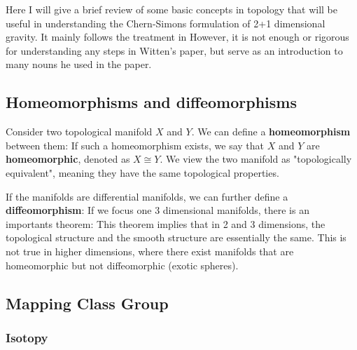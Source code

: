 Here I will give a brief review of some basic concepts in topology
that will be useful in understanding the Chern-Simons formulation of
2+1 dimensional gravity. It mainly follows the treatment in
\cite{Carlip:1998qg} However, it is not enough or rigorous for
understanding any steps in Witten's paper, but serve as an
introduction to many nouns he used in the paper.

\subsection{Homeomorphisms and diffeomorphisms}

Consider two topological manifold \(X\) and \(Y\). We can define a
\textbf{homeomorphism} between them:
If such a homeomorphism exists, we say that \(X\) and \(Y\) are
\textbf{homeomorphic}, denoted as \(X \cong Y\). We view the two
manifold as "topologically equivalent", meaning they have the same
topological properties.

If the manifolds are differential manifolds, we can further define a
\textbf{diffeomorphism}:
If we focus one 3 dimensional manifolds, there is an importants theorem:
This theorem implies that in 2 and 3 dimensions, the topological
structure and the smooth structure are essentially the same. This is
not true in higher dimensions, where there exist manifolds that are
homeomorphic but not diffeomorphic (exotic spheres).

\subsection{Mapping Class Group}

\subsubsection{Isotopy}

